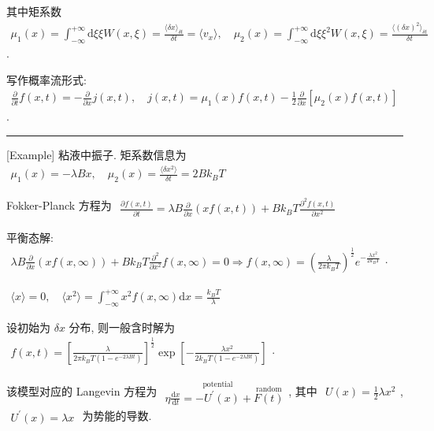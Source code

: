 \documentclass[../../main.tex]{subfiles}
\begin{document}
其中矩系数 $\begin{aligned}
    \mu_{1}(x) = \int_{-\infty}^{+\infty}\mathrm{d}\xi\xi W(x,\xi) = \frac{\langle \delta x\rangle_{\delta t}}{\delta t} = \langle v_{x}\rangle,\quad \mu_{2}(x) = \int_{-\infty}^{+\infty}\mathrm{d}\xi\xi^{2}W(x,\xi) = \frac{\langle (\delta x)^{2}\rangle_{\delta t}}{\delta t}
\end{aligned}$. 

写作概率流形式: $\begin{aligned}
    \frac{\partial}{\partial t}f(x,t) = -\frac{\partial}{\partial x}j(x,t),\quad j(x,t) = \mu_{1}(x)f(x,t) - \frac{1}{2}\frac{\partial}{\partial x}\left[\mu_{2}(x)f(x,t)\right]
\end{aligned}$. 

\vspace{0.5em}\hrule\vspace{0.5em}

[Example] 粘液中振子. 矩系数信息为 $\begin{aligned}
    \mu_{1}(x) = -\lambda Bx,\quad \mu_{2}(x) = \frac{\langle\delta x^{2}\rangle}{\delta t} = 2Bk_{B}T
\end{aligned}$

Fokker-Planck 方程为 $\begin{aligned}
    \frac{\partial f(x,t)}{\partial t} = \lambda B\frac{\partial }{\partial x}(xf(x,t)) + Bk_{B}T\frac{\partial^{2}f(x,t)}{\partial x^{2}}
\end{aligned}$

平衡态解: $\begin{aligned}
    \lambda B\frac{\partial}{\partial x}(xf(x,\infty)) + Bk_{B}T\frac{\partial^{2}}{\partial x^{2}}f(x,\infty) = 0\Rightarrow 
    f(x,\infty) = \left(\frac{\lambda}{2\pi k_{B}T}\right)^{\frac{1}{2}}e^{-\frac{\lambda x^{2}}{2k_{B}T}}
\end{aligned}$. 

$\begin{aligned}
    \langle x\rangle = 0,\quad \langle x^{2}\rangle = \int_{-\infty}^{+\infty}x^{2}f(x,\infty)\mathrm{d}x = \frac{k_{B}T}{\lambda}
\end{aligned}$

设初始为 $\delta{x}$ 分布, 则一般含时解为 $\begin{aligned}
    f(x,t) = \left[\frac{\lambda}{2\pi k_{B}T(1-e^{-2\lambda B t})}\right]^{\frac{1}{2}} \exp\left[ -\frac{\lambda x^{2}}{2k_{B}T(1-e^{-2\lambda B t})} \right]
\end{aligned}$. 

该模型对应的 Langevin 方程为 $\begin{aligned}
    \eta\frac{\mathrm{d}x}{\mathrm{d}t} = \stackrel{\text{potential}}{-U^{\prime}(x)} + \stackrel{\text{random}}{F(t)}
\end{aligned}$, 其中 $\begin{aligned}
    U(x) = \frac{1}{2}\lambda x^{2}
\end{aligned}$, $\begin{aligned}
    U^{\prime}(x) = \lambda x
\end{aligned}$ 为势能的导数.
\end{document}
